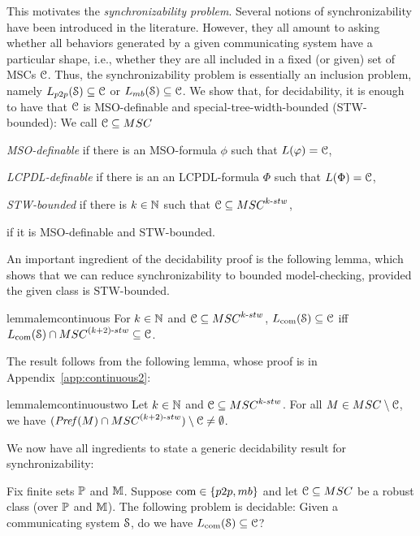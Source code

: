 \documentclass[a4paper,UKenglish,cleveref, autoref, thm-restate]{lipics-v2021}
\begin{document}
This motivates the \emph{synchronizability problem}.
Several notions of synchronizability have been introduced in the literature.
However, they all amount to asking whether all behaviors generated by
a given communicating system have a particular shape,
i.e., whether they are all included in a fixed (or given) set of MSCs $\mathcal{C}$.
Thus, the synchronizability problem is essentially an inclusion problem,
namely $\ppL{\Sys} \subseteq \Class$ or $\mbL{\Sys} \subseteq \Class$.
%
We show that, for decidability, it is enough to have that $\mathcal{C}$
is MSO-definable and special-tree-width-bounded (STW-bounded):
%
We call $\Class \subseteq \MSCs$
\begin{enumerate*}[label={(\roman*)}]
\item \emph{MSO-definable} if there is
an MSO-formula $\phi$ such that $L(\varphi) = \mathcal{C}$,
\item \emph{LCPDL-definable} if there is an
an LCPDL-formula $\Phi$ such that $L(\Phi) = \mathcal{C}$,
\item \emph{STW-bounded} if there is $k \in \mathbb{N}$
such that $\Class \subseteq \stwMSCs{k}$,
\item \emph{\nameclass} if it is MSO-definable and STW-bounded.
\end{enumerate*}

An important ingredient of the decidability proof is the following lemma,
which shows that we can reduce synchronizability
to bounded model-checking, provided the given class
is STW-bounded.

\begin{restatable}{lemma}{lemcontinuous}\label{lem:continuous}
For $k \in \mathbb{N}$ and $\Class \subseteq \stwMSCs{k}$,
$L_{\textup{com}}(\mathcal{S}) \subseteq \mathcal{C}$ iff
$\cL{\System} \cap \stwMSCs{(k+2)} \subseteq \Class$.
\end{restatable}

The result follows from the following lemma, whose proof is in
Appendix~\ref{app:continuous2}:

\begin{restatable}{lemma}{lemcontinuoustwo}\label{lem:continuous2}
	Let $k \in \mathbb{N}$ and $\Class \subseteq \stwMSCs{k}$. For all
	$M \in \MSCs \setminus \Class$, we have
	$(\Pref{M} \cap \stwMSCs{(k+2)}) \setminus \Class \neq \emptyset$.
\end{restatable}


We now have all ingredients to state a generic decidability result
for synchronizability:

\begin{theorem}\label{thm:sync}
Fix finite sets $\mathbb{P}$ and $\mathbb{M}$.
Suppose $\comsymb \in \{\ppsymb, \mbsymb\}$ and let $\Class \subseteq \MSCs$ be a robust class (over $\mathbb{P}$ and $\mathbb{M}$).
The following problem is decidable:
Given a communicating system $\mathcal{S}$, do we have $L_{\textup{com}}(\mathcal{S}) \subseteq \mathcal{C}$?
\end{theorem}
\end{document}
